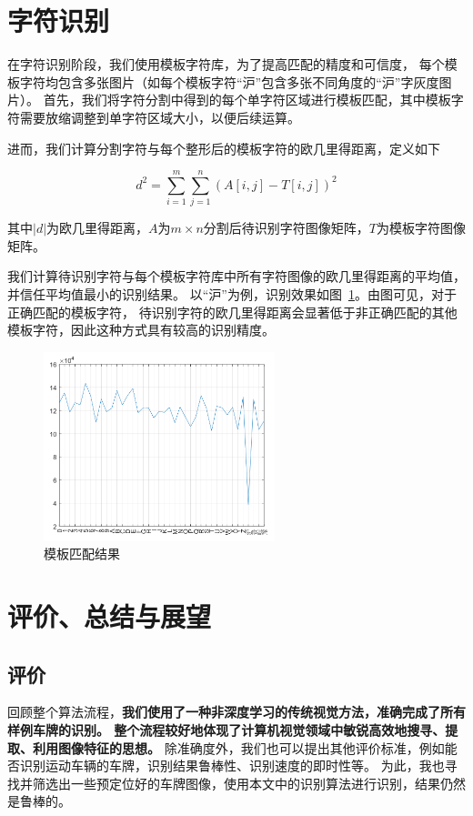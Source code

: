 \documentclass[utf8,a4paper]{ctexart}
\begin{document}
\section{字符识别}
在字符识别阶段，我们使用模板字符库，为了提高匹配的精度和可信度，
每个模板字符均包含多张图片（如每个模板字符``沪''包含多张不同角度的``沪''字灰度图片）。
首先，我们将字符分割中得到的每个单字符区域进行模板匹配，其中模板字符需要放缩调整到单字符区域大小，以便后续运算。

进而，我们计算分割字符与每个整形后的模板字符的欧几里得距离，定义如下

\begin{equation}
    d^2=\sum_{i=1}^{m}\sum_{j=1}^n(A[i,j]-T[i,j])^2
\end{equation}

其中$|d|$为欧几里得距离，$A$为$m\times n$分割后待识别字符图像矩阵，$T$为模板字符图像矩阵。

我们计算待识别字符与每个模板字符库中所有字符图像的欧几里得距离的平均值，并信任平均值最小的识别结果。
以``沪''为例，识别效果如图~\ref{fig:template_match}。由图可见，对于正确匹配的模板字符，
待识别字符的欧几里得距离会显著低于非正确匹配的其他模板字符，因此这种方式具有较高的识别精度。

\begin{figure}[h]
    \centering
    \includegraphics[width=0.6\textwidth]{./img/easy/识别效果可视化.png}
    \caption{模板匹配结果}
    \label{fig:template_match}
\end{figure}

\section{评价、总结与展望}
\subsection{评价}
回顾整个算法流程，\textbf{我们使用了一种非深度学习的传统视觉方法，准确完成了所有样例车牌的识别。
整个流程较好地体现了计算机视觉领域中敏锐高效地搜寻、提取、利用图像特征的思想。}
除准确度外，我们也可以提出其他评价标准，例如能否识别运动车辆的车牌，识别结果鲁棒性、识别速度的即时性等。
为此，我也寻找并筛选出一些预定位好的车牌图像，使用本文中的识别算法进行识别，结果仍然是鲁棒的。
\end{document}
